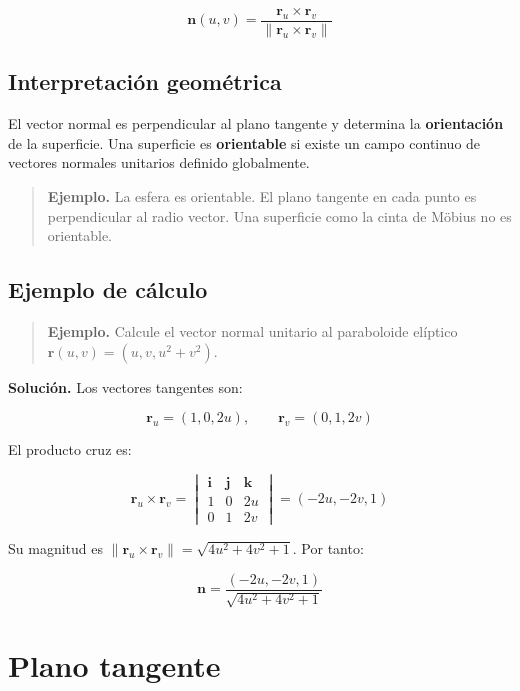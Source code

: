 \documentclass[
]{book}
\begin{document}
\[
\mathbf{n}(u, v) = \frac{\mathbf{r}_u \times \mathbf{r}_v}{\|\mathbf{r}_u \times \mathbf{r}_v\|}
\]

\subsection{Interpretación geométrica}\label{interpretaciuxf3n-geomuxe9trica-2}

El vector normal es perpendicular al plano tangente y determina la \textbf{orientación} de la superficie. Una superficie es \textbf{orientable} si existe un campo continuo de vectores normales unitarios definido globalmente.

\begin{quote}
\textbf{Ejemplo.} La esfera es orientable. El plano tangente en cada punto es perpendicular al radio vector. Una superficie como la cinta de Möbius no es orientable.
\end{quote}

\subsection{Ejemplo de cálculo}\label{ejemplo-de-cuxe1lculo}

\begin{quote}
\textbf{Ejemplo.} Calcule el vector normal unitario al paraboloide elíptico \(\mathbf{r}(u, v) = (u, v, u^2 + v^2)\).
\end{quote}

\textbf{Solución.} Los vectores tangentes son:

\[
\mathbf{r}_u = (1, 0, 2u), \qquad \mathbf{r}_v = (0, 1, 2v)
\]

El producto cruz es:

\[
\mathbf{r}_u \times \mathbf{r}_v = \begin{vmatrix}
\mathbf{i} & \mathbf{j} & \mathbf{k} \\
1 & 0 & 2u \\
0 & 1 & 2v
\end{vmatrix} = (-2u, -2v, 1)
\]

Su magnitud es \(\|\mathbf{r}_u \times \mathbf{r}_v\| = \sqrt{4u^2 + 4v^2 + 1}\). Por tanto:

\[
\mathbf{n} = \frac{(-2u, -2v, 1)}{\sqrt{4u^2 + 4v^2 + 1}}
\]

\section{Plano tangente}\label{plano-tangente}
\end{document}
